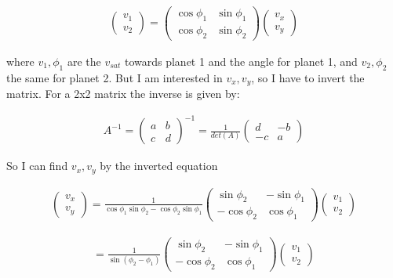 \documentclass[a4paper, 10pt]{article}
\begin{document}
\begin{align}
\begin{pmatrix}
v_1\\
v_2
\end{pmatrix}
=
\begin{pmatrix}
\cos \phi_1 & \sin \phi_1 \\
\cos \phi_2 & \sin \phi_2 
\end{pmatrix}
\begin{pmatrix}
v_x\\
v_y
\end{pmatrix}
\end{align}  

where $v_1,\phi_1$ are the $v_{sat}$ towards planet 1 and the angle for planet 1, and $v_2,\phi_2$ the same for planet 2. But I am interested in $v_x,
v_y$, so I have to invert the matrix. For a 2x2 matrix the inverse is given by:

\begin{align}
A^{-1} = 
\begin{pmatrix}
a & b \\
c & d 
\end{pmatrix}^{-1}
=
\frac{1}{det(A)} 
\begin{pmatrix}
d & -b \\
-c & a 
\end{pmatrix}
\end{align}

So I can find $v_x,v_y$ by the inverted equation

\begin{align}
\begin{pmatrix}
v_x\\
v_y
\end{pmatrix}
=
\frac{1}{\cos \phi_1 \sin \phi_2 - \cos \phi_2 \sin \phi_1}
\begin{pmatrix}
\sin \phi_2 & -\sin \phi_1 \\
-\cos \phi_2 & \cos \phi_1 
\end{pmatrix}
\begin{pmatrix}
v_1\\
v_2
\end{pmatrix}
\end{align}

\begin{align}
=
\frac{1}{\sin (\phi_2 - \phi_1)}
\begin{pmatrix}
\sin \phi_2 & -\sin \phi_1 \\
-\cos \phi_2 & \cos \phi_1 
\end{pmatrix}
\begin{pmatrix}
v_1\\
v_2
\end{pmatrix}
\end{align}
\end{document}
